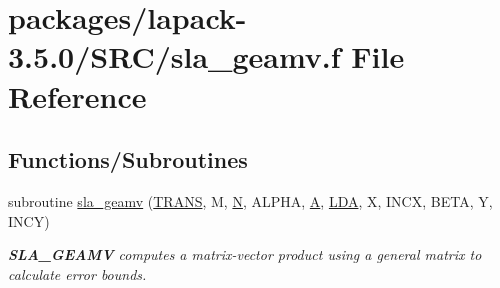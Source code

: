 \hypertarget{sla__geamv_8f}{}\section{packages/lapack-\/3.5.0/\+S\+R\+C/sla\+\_\+geamv.f File Reference}
\label{sla__geamv_8f}
\subsection*{Functions/\+Subroutines}
\begin{DoxyCompactItemize}
\item 
subroutine \hyperlink{group__realGEcomputational_ga3e50914b0060d102e0c71d08ee0d5618}{sla\+\_\+geamv} (\hyperlink{superlu__enum__consts_8h_a0c4e17b2d5cea33f9991ccc6a6678d62a1f61e3015bfe0f0c2c3fda4c5a0cdf58}{T\+R\+A\+N\+S}, M, \hyperlink{polmisc_8c_a0240ac851181b84ac374872dc5434ee4}{N}, A\+L\+P\+H\+A, \hyperlink{classA}{A}, \hyperlink{example__user_8c_ae946da542ce0db94dced19b2ecefd1aa}{L\+D\+A}, X, I\+N\+C\+X, B\+E\+T\+A, Y, I\+N\+C\+Y)
\begin{DoxyCompactList}\small\item\em {\bfseries S\+L\+A\+\_\+\+G\+E\+A\+M\+V} computes a matrix-\/vector product using a general matrix to calculate error bounds. \end{DoxyCompactList}\end{DoxyCompactItemize}
